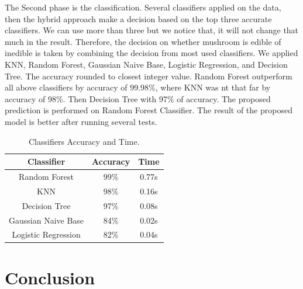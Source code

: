 \documentclass[a4paper,11pt]{article}
\begin{document}
            The Second phase is the classification.  Several classifiers applied on the data, then the hybrid approach make a decision based on the top three accurate classifiers. We can use more than three but we notice that, it will not change that much in the result. Therefore, the decision on whether mushroom is edible of inedible is taken by combining the decision from most used classifiers.  We applied KNN, Random Forest, Gaussian Naive Base, Logistic Regression, and Decision Tree. The accuracy rounded to closest integer value. Random Forest outperform all above classifiers by accuracy of 99.98\%, where KNN was nt that far by accuracy of 98\%. Then Decision Tree with 97\% of accuracy. The proposed prediction is performed on Random Forest Classifier. The result of the proposed model is better after running several tests.

            \begin{table}[h!]
                \begin{center}
                \begin{tabular} {|| c | c | c ||}
                    \hline
                    \textbf {Classifier} & \textbf {Accuracy} & \textbf {Time} \\
                    \hline \hline
                    Random Forest & 99\% & 0.77s \\
                    \hline
                    KNN & 98\% & 0.16s \\
                    \hline
                    Decision Tree & 97\% & 0.08s \\
                    \hline
                    Gaussian Naive Base & 84\% & 0.02s \\
                    \hline
                    Logistic Regression & 82\% & 0.04s \\
                    \hline
                \end{tabular}
                \caption{Classifiers Accuracy and Time.}
                \end{center}
            \end{table}

        \section{Conclusion}
\end{document}
